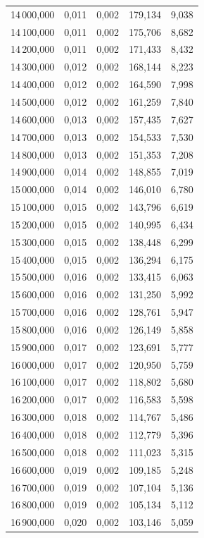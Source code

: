 \begin{longtable}{rrrrr}
14\,000,000 & 0,011 & 0,002 & 179,134 & 9,038\\
14\,100,000 & 0,011 & 0,002 & 175,706 & 8,682\\
14\,200,000 & 0,011 & 0,002 & 171,433 & 8,432\\
14\,300,000 & 0,012 & 0,002 & 168,144 & 8,223\\
14\,400,000 & 0,012 & 0,002 & 164,590 & 7,998\\
14\,500,000 & 0,012 & 0,002 & 161,259 & 7,840\\
14\,600,000 & 0,013 & 0,002 & 157,435 & 7,627\\
14\,700,000 & 0,013 & 0,002 & 154,533 & 7,530\\
14\,800,000 & 0,013 & 0,002 & 151,353 & 7,208\\
14\,900,000 & 0,014 & 0,002 & 148,855 & 7,019\\
15\,000,000 & 0,014 & 0,002 & 146,010 & 6,780\\
15\,100,000 & 0,015 & 0,002 & 143,796 & 6,619\\
15\,200,000 & 0,015 & 0,002 & 140,995 & 6,434\\
15\,300,000 & 0,015 & 0,002 & 138,448 & 6,299\\
15\,400,000 & 0,015 & 0,002 & 136,294 & 6,175\\
15\,500,000 & 0,016 & 0,002 & 133,415 & 6,063\\
15\,600,000 & 0,016 & 0,002 & 131,250 & 5,992\\
15\,700,000 & 0,016 & 0,002 & 128,761 & 5,947\\
15\,800,000 & 0,016 & 0,002 & 126,149 & 5,858\\
15\,900,000 & 0,017 & 0,002 & 123,691 & 5,777\\
16\,000,000 & 0,017 & 0,002 & 120,950 & 5,759\\
16\,100,000 & 0,017 & 0,002 & 118,802 & 5,680\\
16\,200,000 & 0,017 & 0,002 & 116,583 & 5,598\\
16\,300,000 & 0,018 & 0,002 & 114,767 & 5,486\\
16\,400,000 & 0,018 & 0,002 & 112,779 & 5,396\\
16\,500,000 & 0,018 & 0,002 & 111,023 & 5,315\\
16\,600,000 & 0,019 & 0,002 & 109,185 & 5,248\\
16\,700,000 & 0,019 & 0,002 & 107,104 & 5,136\\
16\,800,000 & 0,019 & 0,002 & 105,134 & 5,112\\
16\,900,000 & 0,020 & 0,002 & 103,146 & 5,059\\

\end{longtable}
